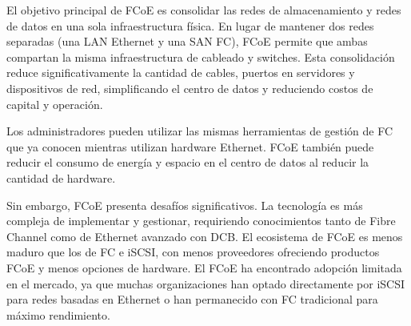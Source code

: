 El objetivo principal de FCoE es consolidar las redes de almacenamiento y redes de datos en una sola infraestructura física. En lugar de mantener dos redes separadas (una LAN Ethernet y una SAN FC), FCoE permite que ambas compartan la misma infraestructura de cableado y switches. Esta consolidación reduce significativamente la cantidad de cables, puertos en servidores y dispositivos de red, simplificando el centro de datos y reduciendo costos de capital y operación.

Los administradores pueden utilizar las mismas herramientas de gestión de FC que ya conocen mientras utilizan hardware Ethernet. FCoE también puede reducir el consumo de energía y espacio en el centro de datos al reducir la cantidad de hardware. 

Sin embargo, FCoE presenta desafíos significativos. La tecnología es más compleja de implementar y gestionar, requiriendo conocimientos tanto de Fibre Channel como de Ethernet avanzado con DCB. El ecosistema de FCoE es menos maduro que los de FC e iSCSI, con menos proveedores ofreciendo productos FCoE y menos opciones de hardware. El FCoE ha encontrado adopción limitada en el mercado, ya que muchas organizaciones han optado directamente por iSCSI para redes basadas en Ethernet o han permanecido con FC tradicional para máximo rendimiento.